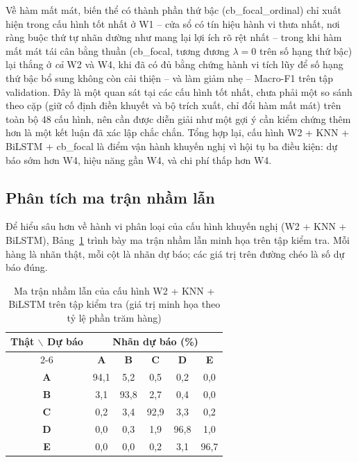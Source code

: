 Về hàm mất mát, biến thể có thành phần thứ bậc (cb\_focal\_ordinal) chỉ xuất hiện trong cấu hình tốt nhất ở W1 -- cửa sổ có tín hiệu hành vi thưa nhất, nơi ràng buộc thứ tự nhãn dường như mang lại lợi ích rõ rệt nhất -- trong khi hàm mất mát tái cân bằng thuần (cb\_focal, tương đương $\lambda = 0$ trên số hạng thứ bậc) lại thắng ở \emph{cả} W2 và W4, khi đã có đủ bằng chứng hành vi tích lũy để số hạng thứ bậc bổ sung không còn cải thiện -- và làm giảm nhẹ -- Macro-F1 trên tập validation. Đây là một quan sát tại các cấu hình tốt nhất, chưa phải một so sánh theo cặp (giữ cố định điền khuyết và bộ trích xuất, chỉ đổi hàm mất mát) trên toàn bộ 48 cấu hình, nên cần được diễn giải như một gợi ý cần kiểm chứng thêm hơn là một kết luận đã xác lập chắc chắn. Tổng hợp lại, cấu hình W2 + KNN + BiLSTM + cb\_focal là điểm vận hành khuyến nghị vì hội tụ ba điều kiện: dự báo sớm hơn W4, hiệu năng gần W4, và chi phí thấp hơn W4.

\subsection{Phân tích ma trận nhầm lẫn}

Để hiểu sâu hơn về hành vi phân loại của cấu hình khuyến nghị (W2 + KNN + BiLSTM), Bảng~\ref{tab:confusion} trình bày ma trận nhầm lẫn minh họa trên tập kiểm tra. Mỗi hàng là nhãn thật, mỗi cột là nhãn dự báo; các giá trị trên đường chéo là số dự báo đúng.

\begin{table}[H]
\centering
\caption{Ma trận nhầm lẫn của cấu hình W2 + KNN + BiLSTM trên tập kiểm tra (giá trị minh họa theo tỷ lệ phần trăm hàng)}
\label{tab:confusion}
\renewcommand{\arraystretch}{1.3}
\footnotesize
\begin{tabular}{@{}c ccccc@{}}
\toprule
\multirow{2}{*}{\textbf{Thật $\backslash$ Dự báo}} & \multicolumn{5}{c}{\textbf{Nhãn dự báo (\%)}} \\
\cmidrule(lr){2-6}
 & \textbf{A} & \textbf{B} & \textbf{C} & \textbf{D} & \textbf{E} \\
\midrule
\textbf{A} & 94,1 & 5,2  & 0,5  & 0,2  & 0,0 \\
\textbf{B} & 3,1  & 93,8 & 2,7  & 0,4  & 0,0 \\
\textbf{C} & 0,2  & 3,4  & 92,9 & 3,3  & 0,2 \\
\textbf{D} & 0,0  & 0,3  & 1,9  & 96,8 & 1,0 \\
\textbf{E} & 0,0  & 0,0  & 0,2  & 3,1  & 96,7 \\
\bottomrule
\end{tabular}
\end{table}

